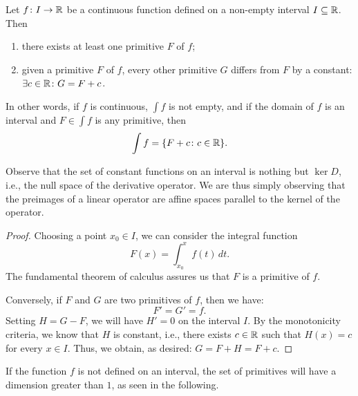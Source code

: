 \begin{theorem}
\label{th:primitive}
\mymark{***}
Let $f\colon I \to {\mathbb R}$
be a continuous function defined on a non-empty interval $I\subseteq {\mathbb R}$. Then
\begin{enumerate}
\item there exists at least one primitive $F$ of $f$;
\item given a primitive $F$ of $f$, every other
primitive $G$ differs from $F$ by a constant: $\exists c\in {\mathbb R}\colon G= F+c$.
\end{enumerate}

In other words, if $f$ is continuous, $\int f$ is not empty, and if 
the domain of $f$ is an interval and $F\in \int f$ is any primitive, then
\[
  \int f = {\left\{ F+c \colon c \in {\mathbb R} \right\}}.
\]
\end{theorem}

Observe that the set of constant functions
on an interval
is nothing but $\ker D$, i.e., the null space of the derivative operator.
We are thus simply observing that the preimages of a linear operator
are affine spaces parallel to the kernel of the operator.

\begin{proof}
\mymark{***}
Choosing a point $x_0\in I$, we can
consider the integral function
\[
  F(x) = \int_{x_0}^x f(t)\, dt.
\]
The fundamental theorem of calculus
assures us that $F$ is a primitive of $f$.

Conversely, if $F$ and $G$ are two primitives of $f$, then we have:
\[
  F' = G' = f.
\]
Setting $H=G-F$, we will have $H'=0$ on the interval $I$. By the monotonicity
criteria, we know that $H$ is constant, i.e., there exists $c\in {\mathbb R}$ such
that $H(x)=c$ for every $x\in I$. Thus, we obtain, as desired: $G=F+H=F+c$.
\end{proof}

If the function $f$ is not defined on an interval, the set of primitives
will have a dimension greater than $1$, as seen in the following.

